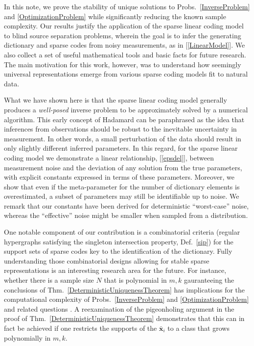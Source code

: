 \documentclass[9pt,twocolumn]{pnas-new}
\renewcommand{\eqref}[1]{\textnormal{[\ref{#1}]}}
\begin{document}
In this note, we prove the stability of unique solutions to Probs.~\ref{InverseProblem} and \ref{OptimizationProblem} while significantly reducing the known sample complexity. Our results justify the application of the sparse linear coding model to blind source separation problems, wherein the goal is to infer the generating dictionary and sparse codes from noisy measurements, as in \eqref{LinearModel}. We also collect a set of useful mathematical tools and basic facts for future research. The main motivation for this work, however, was to understand how seemingly universal representations emerge from various sparse coding models fit to natural data.

What we have shown here is that the sparse linear coding model generally produces a \textit{well-posed} inverse problem to be approximately solved by a numerical algorithm. This early concept of Hadamard \cite{Hadamard1902} can be paraphrased as the idea that inferences from observations should be robust to the inevitable uncertainty in measurement. In other words, a small perturbation of the data should result in only slightly different inferred parameters. In this regard, for the sparse linear coding model we demonstrate a linear relationship, \eqref{epsdel}, between measurement noise and the deviation of any solution from the true parameters, with explicit constants expressed in terms of these parameters. Moreover, we show that even if the meta-parameter for the number of dictionary elements is overestimated, a subset of parameters may still be identifiable up to noise. We remark that our constants have been derived for deterministic ``worst-case'' noise, whereas the ``effective'' noise might be smaller when sampled from a distribution.

One notable component of our contribution is a combinatorial criteria (regular hypergraphs satisfying the singleton intersection property, Def.~\ref{sip}) for the support sets of sparse codes key to the identification of the dictionary. Fully understanding those combinatorial designs allowing for stable sparse representations is an interesting research area for the future. For instance, whether there is a sample size $N$ that is polynomial in $m,k$ gauranteeing the conclusions of Thm.~\ref{DeterministicUniquenessTheorem} has implications for the computational complexity of Probs.~\ref{InverseProblem} and \ref{OptimizationProblem} and related questions \cite{Tillmann15}. A reexamination of the pigeonholing argument in the proof of Thm.~\ref{DeterministicUniquenessTheorem} demonstrates that this can in fact be achieved if one restricts the supports of the $\mathbf{\bar x}_i$ to a class that grows polynomially in $m, k$. 
\end{document}
